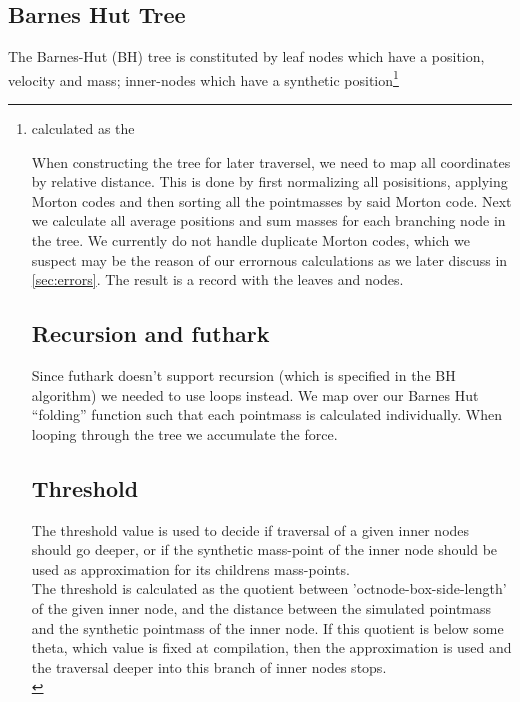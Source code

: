 \subsection{Barnes Hut Tree}
The Barnes-Hut (BH) tree is constituted by leaf nodes which have a position, velocity and mass; inner-nodes which have a synthetic position\footnote{calculated as the  


When constructing the tree for later traversel, we need to map all coordinates
by relative distance. This is done by first normalizing all posisitions,
applying Morton codes and then sorting all the pointmasses by said Morton code.
Next we calculate all average positions and sum masses for each branching node
in the tree. We currently do not handle duplicate Morton codes, which we suspect
may be the reason of our errornous calculations as we later discuss in
\autoref{sec:errors}. The result is a record with the leaves and nodes.

\subsection{Recursion and futhark}
Since futhark doesn't support recursion (which is specified in the BH algorithm)
we needed to use loops instead. We map over our Barnes Hut ``folding'' function
such that each pointmass is calculated individually. When looping through the
tree we accumulate the force.

\begin{Figure}
  \centering
\lstset{firstnumber=41}

\end{Figure}

\subsection{Threshold}
The threshold value is used to decide if traversal of a given inner nodes should go
deeper, or if the synthetic mass-point of the inner node should be used as
approximation for its childrens mass-points. \\


The threshold is calculated as the quotient between 'octnode-box-side-length' of
the given inner node, and the distance between the simulated pointmass and the
synthetic pointmass of the inner node. If this quotient is below some theta,
which value is fixed at compilation, then the approximation is used and the
traversal deeper into this branch of inner nodes stops. \\

}
